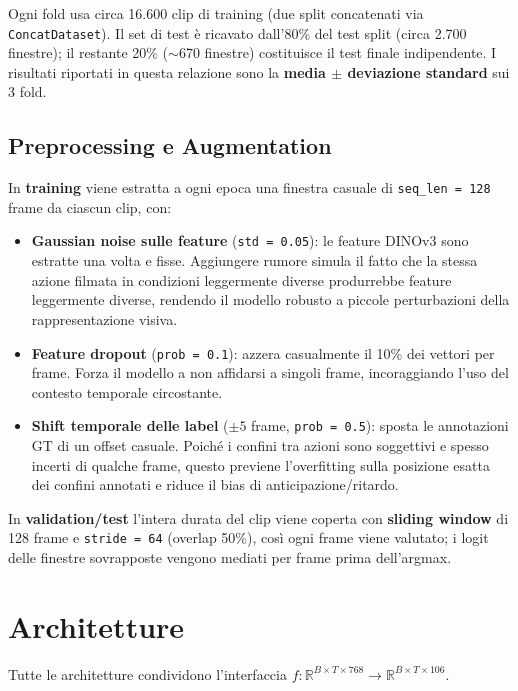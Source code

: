 \documentclass[12pt, a4paper]{article}
\begin{document}
Ogni fold usa circa 16.600 clip di training (due split concatenati via
\texttt{ConcatDataset}). Il set di test è ricavato dall'80\% del test split
(circa 2.700 finestre); il restante 20\% ($\sim$670 finestre) costituisce il
test finale indipendente. I risultati riportati in questa relazione sono la
\textbf{media $\pm$ deviazione standard} sui 3 fold.

\subsection{Preprocessing e Augmentation}

In \textbf{training} viene estratta a ogni epoca una finestra casuale di
\texttt{seq\_len = 128} frame da ciascun clip, con:
\begin{itemize}
  \item \textbf{Gaussian noise sulle feature} (\texttt{std = 0.05}): le feature
        DINOv3 sono estratte una volta e fisse. Aggiungere rumore simula il fatto
        che la stessa azione filmata in condizioni leggermente diverse produrrebbe
        feature leggermente diverse, rendendo il modello robusto a piccole
        perturbazioni della rappresentazione visiva.
  \item \textbf{Feature dropout} (\texttt{prob = 0.1}): azzera casualmente il
        10\% dei vettori per frame. Forza il modello a non affidarsi a singoli
        frame, incoraggiando l'uso del contesto temporale circostante.
  \item \textbf{Shift temporale delle label} ($\pm5$ frame, \texttt{prob = 0.5}):
        sposta le annotazioni GT di un offset casuale. Poich\'e i confini tra
        azioni sono soggettivi e spesso incerti di qualche frame, questo previene
        l'overfitting sulla posizione esatta dei confini annotati e riduce il
        bias di anticipazione/ritardo.
\end{itemize}
In \textbf{validation/test} l'intera durata del clip viene coperta con
\textbf{sliding window} di 128 frame e \texttt{stride = 64} (overlap 50\%),
cos\`i ogni frame viene valutato; i logit delle finestre sovrapposte vengono
mediati per frame prima dell'argmax.

\section{Architetture}
\label{sec:architetture}

Tutte le architetture condividono l'interfaccia
$f: \mathbb{R}^{B\times T\times 768} \to \mathbb{R}^{B\times T\times 106}$.
\end{document}
